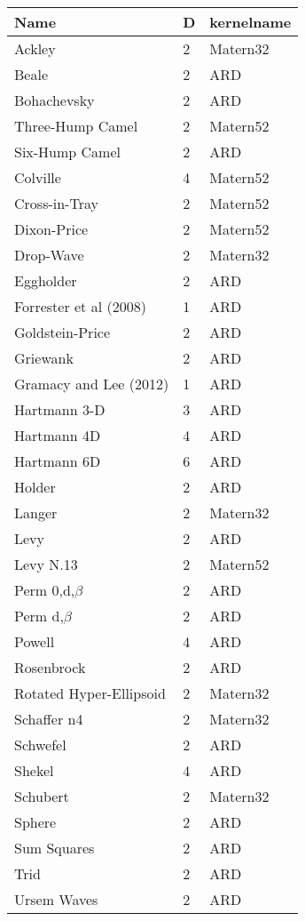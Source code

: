 \begin{tabular}{lll}
Name & D & kernelname \\ 
\hline 
Ackley                  & 2 & Matern32 \\ 
Beale                   & 2 & ARD      \\ 
Bohachevsky             & 2 & ARD      \\ 
Three-Hump Camel        & 2 & Matern52 \\ 
Six-Hump Camel          & 2 & ARD      \\ 
Colville                & 4 & Matern52 \\ 
Cross-in-Tray           & 2 & Matern52 \\ 
Dixon-Price             & 2 & Matern52 \\ 
Drop-Wave               & 2 & Matern32 \\ 
Eggholder               & 2 & ARD      \\ 
Forrester et al (2008)  & 1 & ARD      \\ 
Goldstein-Price         & 2 & ARD      \\ 
Griewank                & 2 & ARD      \\ 
Gramacy and Lee (2012)  & 1 & ARD      \\ 
Hartmann 3-D            & 3 & ARD      \\ 
Hartmann 4D             & 4 & ARD      \\ 
Hartmann 6D             & 6 & ARD      \\ 
Holder                  & 2 & ARD      \\ 
Langer                  & 2 & Matern32 \\ 
Levy                    & 2 & ARD      \\ 
Levy N.13               & 2 & Matern52 \\ 
Perm 0,d,$\beta$        & 2 & ARD      \\ 
Perm d,$\beta$          & 2 & ARD      \\ 
Powell                  & 4 & ARD      \\ 
Rosenbrock              & 2 & ARD      \\ 
Rotated Hyper-Ellipsoid & 2 & Matern32 \\ 
Schaffer n4             & 2 & Matern32 \\ 
Schwefel                & 2 & ARD      \\ 
Shekel                  & 4 & ARD      \\ 
Schubert                & 2 & Matern32 \\ 
Sphere                  & 2 & ARD      \\ 
Sum Squares             & 2 & ARD      \\ 
Trid                    & 2 & ARD      \\ 
Ursem Waves             & 2 & ARD      \\ 
\hline 
\end{tabular}